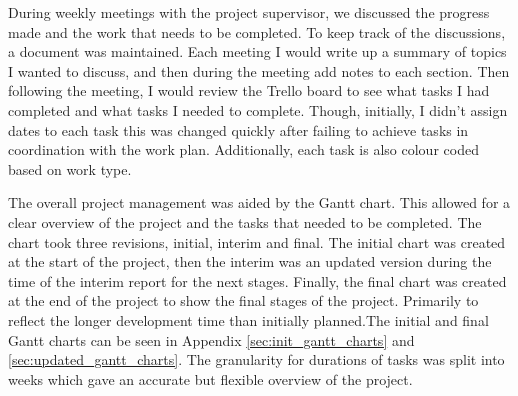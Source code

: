 \documentclass [11pt,a4paper]{article}
\begin{document}
During weekly meetings with the project supervisor, we discussed the progress made and the work that needs to be completed. To keep track of the discussions, a document was maintained. Each meeting I would write up a summary of topics I wanted to discuss, and then during the meeting add notes to each section. Then following the meeting, I would review the Trello board to see what tasks I had completed and what tasks I needed to complete. Though, initially, I didn't assign dates to each task this was changed quickly after failing to achieve tasks in coordination with the work plan. Additionally, each task is also colour coded based on work type.

The overall project management was aided by the Gantt chart. This allowed for a clear overview of the project and the tasks that needed to be completed. The chart took three revisions, initial, interim and final. The initial chart was created at the start of the project, then the interim was an updated version during the time of the interim report for the next stages. Finally, the final chart was created at the end of the project to show the final stages of the project. Primarily to reflect the longer development time than initially planned.The initial and final Gantt charts can be seen in Appendix \ref{sec:init_gantt_charts} and \ref{sec:updated_gantt_charts}. The granularity for durations of tasks was split into weeks which gave an accurate but flexible overview of the project.
\end{document}
